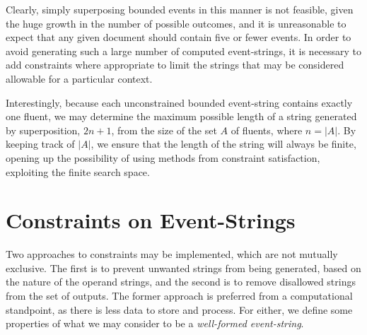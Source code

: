 \documentclass[a4paper,11pt,leqno]{article}
\makeatletter
\newcommand{\vph}[1]{\vphantom{#1}}
\newcommand{\eboxb}[1]{\fbox{$\vph{@}#1$}}
\makeatother
\begin{document}
Clearly, simply superposing bounded events in this manner is not feasible, 
given the huge growth in the number of possible outcomes, and 
it is unreasonable to expect that any given document should contain five or 
fewer events. In order to avoid generating such a large number of computed 
event-strings, it is necessary to add constraints where appropriate to limit the
strings that may be considered allowable for a particular context.

Interestingly, because each unconstrained bounded event-string 
\eboxb{}\eboxb{e}\eboxb{} contains exactly one fluent, we may determine the 
maximum possible length of a string generated by superposition, $2n + 1$, from 
the size of the set $A$ of fluents, where $n = |A|$. By keeping track of $|A|$, 
we ensure that the length of the string will always be finite, opening up the 
possibility of using methods from constraint satisfaction, exploiting the 
finite search space.

\section{Constraints on Event-Strings}\label{constraints}
Two approaches to constraints may be implemented, which are not mutually 
exclusive. The first is to prevent unwanted strings from being generated, based 
on the nature of the operand strings, and the second is to remove disallowed 
strings from the set of outputs. The former approach is preferred from a 
computational standpoint, as there is less data to store and process. For 
either, we define some properties of what we may consider to be a 
\textit{well-formed event-string}.
\end{document}
